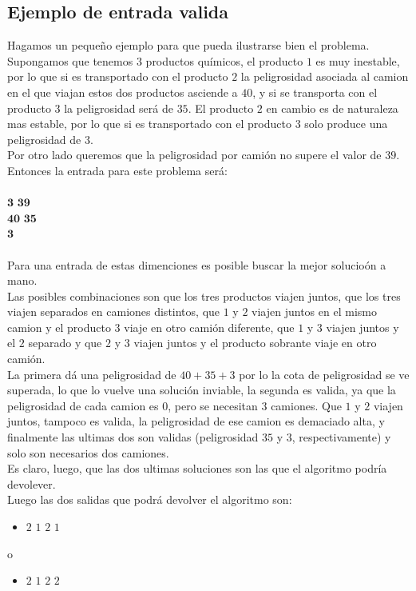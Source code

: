 \subsection{Ejemplo de entrada valida}
Hagamos un pequeño ejemplo para que pueda ilustrarse bien el problema.
\\
Supongamos que tenemos $3$ productos qu\'imicos, el producto $1$ es muy inestable, por lo que si es transportado con el producto $2$ la peligrosidad asociada al camion en el que viajan estos dos productos asciende a $40$, y si se transporta con el producto $3$ la peligrosidad ser\'a de $35$. El producto $2$ en cambio es de naturaleza mas estable, por lo que si es transportado con el producto $3$ solo produce una peligrosidad de $3$.
\\
Por otro lado queremos que la peligrosidad por cami\'on no supere el valor de $39$.
\\
Entonces la entrada para este problema ser\'a:
\\
\\
$\textbf{3 39}$
\\
$\textbf{40 35}$
\\
$\textbf{3}$
\\
\\
Para una entrada de estas dimenciones es posible buscar la mejor solucio\'on a mano.
\\
Las posibles combinaciones son que los tres productos viajen juntos, que los tres viajen separados en camiones distintos, que $1$ y $2$ viajen juntos en el mismo camion y el producto $3$ viaje en otro cami\'on diferente, que $1$ y $3$ viajen juntos y el $2$ separado y que $2$ y $3$ viajen juntos y el producto sobrante viaje en otro cami\'on.
\\
La primera d\'a una peligrosidad de $40+35+3$ por lo la cota de peligrosidad se ve superada, lo que lo vuelve una soluci\'on inviable, la segunda es valida, ya que la peligrosidad de cada camion es $0$, pero se necesitan $3$ camiones. Que $1$ y $2$ viajen juntos, tampoco es valida, la peligrosidad de ese camion es demaciado alta, y finalmente las ultimas dos son validas (peligrosidad $35$ y $3$, respectivamente) y solo son necesarios dos camiones.
\\
Es claro, luego, que las dos ultimas soluciones son las que el algoritmo podr\'ia devolever.
\\
Luego las dos salidas que podr\'a devolver el algoritmo son:
\begin{itemize}
\item $2$ $1$ $2$ $1$
\end{itemize}
o
\begin{itemize}
\item $2$ $1$ $2$ $2$
\end{itemize}
\\
